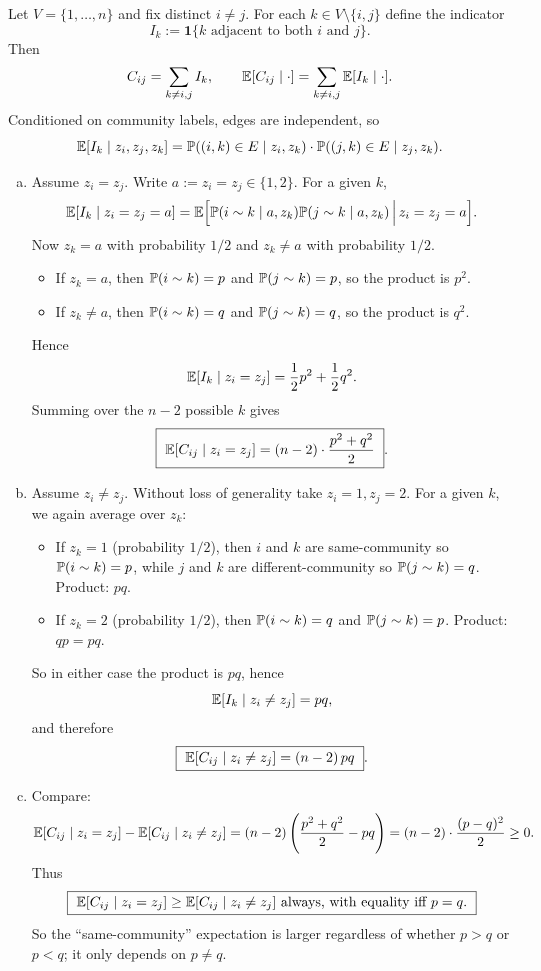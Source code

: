 \documentclass{article}
\begin{document}
\begin{tcolorbox}[colback=white, colframe=black!70, title=\textbf{Solution to Exercise 1}, breakable]
Let $V=\{1,\dots,n\}$ and fix distinct $i\neq j$. For each $k\in V\setminus\{i,j\}$ define the indicator
\[
I_k := \mathbf 1\{\text{$k$ adjacent to both $i$ and $j$}\}.
\]
Then
\[
C_{ij}=\sum_{k\neq i,j} I_k,\qquad \E[C_{ij}\mid \cdot]=\sum_{k\neq i,j}\E[I_k\mid \cdot].
\]
Conditioned on community labels, edges are independent, so
\[
\E[I_k\mid z_i,z_j,z_k]=\P((i,k)\in E\mid z_i,z_k)\cdot \P((j,k)\in E\mid z_j,z_k).
\]

\begin{enumerate}[(a)]
\item Assume $z_i=z_j$. Write $a:=z_i=z_j\in\{1,2\}$. For a given $k$,
\[
\E[I_k\mid z_i=z_j=a]=\E\Big[\P(i\sim k\mid a,z_k)\P(j\sim k\mid a,z_k)\,\Big|\,z_i=z_j=a\Big].
\]
Now $z_k=a$ with probability $1/2$ and $z_k\neq a$ with probability $1/2$.  
\begin{itemize}
\item If $z_k=a$, then $\P(i\sim k)=p$ and $\P(j\sim k)=p$, so the product is $p^2$.
\item If $z_k\neq a$, then $\P(i\sim k)=q$ and $\P(j\sim k)=q$, so the product is $q^2$.
\end{itemize}
Hence
\[
\E[I_k\mid z_i=z_j]=\frac12 p^2+\frac12 q^2.
\]
Summing over the $n-2$ possible $k$ gives
\[
\boxed{\ \E[C_{ij}\mid z_i=z_j]=(n-2)\cdot \frac{p^2+q^2}{2}\ }.
\]

\item Assume $z_i\neq z_j$. Without loss of generality take $z_i=1, z_j=2$. For a given $k$, we again average over $z_k$:
\begin{itemize}
\item If $z_k=1$ (probability $1/2$), then $i$ and $k$ are same-community so $\P(i\sim k)=p$, while $j$ and $k$ are different-community so $\P(j\sim k)=q$. Product: $pq$.
\item If $z_k=2$ (probability $1/2$), then $\P(i\sim k)=q$ and $\P(j\sim k)=p$. Product: $qp=pq$.
\end{itemize}
So in either case the product is $pq$, hence
\[
\E[I_k\mid z_i\neq z_j]=pq,
\]
and therefore
\[
\boxed{\ \E[C_{ij}\mid z_i\neq z_j]=(n-2)\,pq\ }.
\]

\item Compare:
\[
\E[C_{ij}\mid z_i=z_j]-\E[C_{ij}\mid z_i\neq z_j]
=(n-2)\left(\frac{p^2+q^2}{2}-pq\right)
=(n-2)\cdot \frac{(p-q)^2}{2}\ge 0.
\]
Thus
\[
\boxed{\ \E[C_{ij}\mid z_i=z_j]\ge \E[C_{ij}\mid z_i\neq z_j]\ \text{always, with equality iff } p=q.\ }
\]
So the ``same-community'' expectation is larger regardless of whether $p>q$ or $p<q$; it only depends on $p\neq q$.


\end{enumerate}
\end{tcolorbox}
\end{document}
